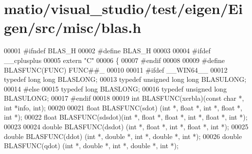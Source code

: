 \hypertarget{matio_2visual__studio_2test_2eigen_2_eigen_2src_2misc_2blas_8h_source}{}\section{matio/visual\+\_\+studio/test/eigen/\+Eigen/src/misc/blas.h}
\label{matio_2visual__studio_2test_2eigen_2_eigen_2src_2misc_2blas_8h_source}

\begin{DoxyCode}
00001 \textcolor{preprocessor}{#ifndef BLAS\_H}
00002 \textcolor{preprocessor}{#define BLAS\_H}
00003 
00004 \textcolor{preprocessor}{#ifdef \_\_cplusplus}
00005 \textcolor{keyword}{extern} \textcolor{stringliteral}{"C"}
00006 \{
00007 \textcolor{preprocessor}{#endif}
00008 
00009 \textcolor{preprocessor}{#define BLASFUNC(FUNC) FUNC##\_}
00010 
00011 \textcolor{preprocessor}{#ifdef \_\_WIN64\_\_}
00012 \textcolor{keyword}{typedef} \textcolor{keywordtype}{long} \textcolor{keywordtype}{long} BLASLONG;
00013 \textcolor{keyword}{typedef} \textcolor{keywordtype}{unsigned} \textcolor{keywordtype}{long} \textcolor{keywordtype}{long} BLASULONG;
00014 \textcolor{preprocessor}{#else}
00015 \textcolor{keyword}{typedef} \textcolor{keywordtype}{long} BLASLONG;
00016 \textcolor{keyword}{typedef} \textcolor{keywordtype}{unsigned} \textcolor{keywordtype}{long} BLASULONG;
00017 \textcolor{preprocessor}{#endif}
00018 
00019 \textcolor{keywordtype}{int}    BLASFUNC(xerbla)(\textcolor{keyword}{const} \textcolor{keywordtype}{char} *, \textcolor{keywordtype}{int} *info, int);
00020 
00021 \textcolor{keywordtype}{float}  BLASFUNC(sdot)  (\textcolor{keywordtype}{int} *, \textcolor{keywordtype}{float}  *, \textcolor{keywordtype}{int} *, \textcolor{keywordtype}{float}  *, \textcolor{keywordtype}{int} *);
00022 \textcolor{keywordtype}{float}  BLASFUNC(sdsdot)(\textcolor{keywordtype}{int} *, \textcolor{keywordtype}{float}  *,        \textcolor{keywordtype}{float}  *, \textcolor{keywordtype}{int} *, \textcolor{keywordtype}{float}  *, \textcolor{keywordtype}{int} *);
00023 
00024 \textcolor{keywordtype}{double} BLASFUNC(dsdot) (\textcolor{keywordtype}{int} *, \textcolor{keywordtype}{float}  *, \textcolor{keywordtype}{int} *, \textcolor{keywordtype}{float}  *, \textcolor{keywordtype}{int} *);
00025 \textcolor{keywordtype}{double} BLASFUNC(ddot)  (\textcolor{keywordtype}{int} *, \textcolor{keywordtype}{double} *, \textcolor{keywordtype}{int} *, \textcolor{keywordtype}{double} *, \textcolor{keywordtype}{int} *);
00026 \textcolor{keywordtype}{double} BLASFUNC(qdot)  (\textcolor{keywordtype}{int} *, \textcolor{keywordtype}{double} *, \textcolor{keywordtype}{int} *, \textcolor{keywordtype}{double} *, \textcolor{keywordtype}{int} *);

\end{DoxyCode}
